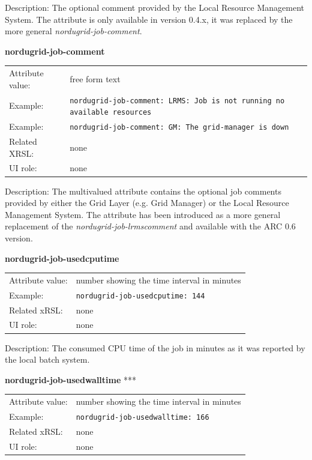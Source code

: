 \documentclass{article}
\begin{document}
Description: The optional comment provided by the Local Resource Management System.
The attribute is only available in version 0.4.x, it was replaced by the more general
{\it nordugrid-job-comment}.


  \hspace*{0.5cm}
  \begin{shaded}
    \textbf{nordugrid-job-comment}
  \end{shaded}
  \begin{tabular}{lp{10cm}}  
    Attribute value:& free form text\\
    Example:& \verb#nordugrid-job-comment: LRMS: Job is not running no available resources#\\
    Example:& \verb#nordugrid-job-comment: GM: The grid-manager is down#\\
    Related XRSL:& none\\
    UI role:& none\\ 
  \end{tabular}

Description: The multivalued attribute contains the optional job comments provided by either 
the Grid Layer (e.g. Grid Manager) or the Local Resource Management System. 
The attribute has been introduced as a more general replacement of the 
{\it nordugrid-job-lrmscomment} and available with the ARC 0.6 version.


  \hspace*{0.5cm}
  \begin{shaded}
    \textbf{nordugrid-job-usedcputime}
  \end{shaded}
  \begin{tabular}{lp{10cm}}  
    Attribute value:& number showing the time interval in minutes\\
    Example:& \verb#nordugrid-job-usedcputime: 144#\\
    Related xRSL:& none\\
    UI role:& none\\
  \end{tabular}

Description: The consumed CPU time of the job in minutes as it was reported by the 
local batch system.


  \hspace*{0.5cm}
  \begin{shaded}
    \textbf{nordugrid-job-usedwalltime} ***
  \end{shaded}
  \begin{tabular}{lp{10cm}}  
    Attribute value:& number showing the time interval in minutes\\
    Example:& \verb#nordugrid-job-usedwalltime: 166#\\
    Related xRSL:& none\\
    UI role:& none\\
  \end{tabular}
\end{document}
